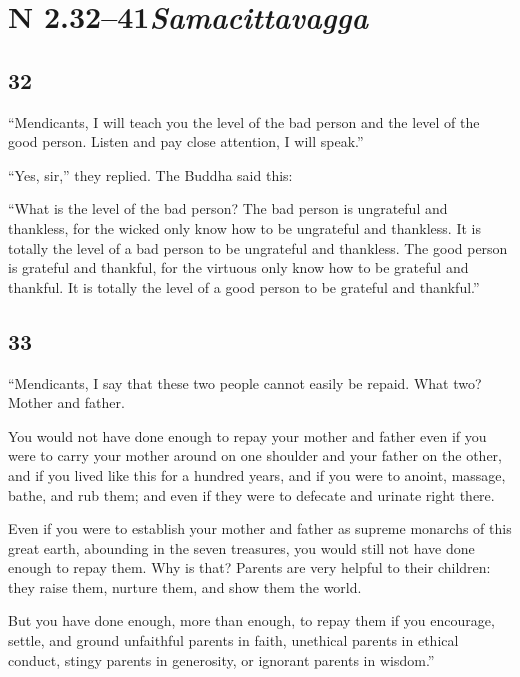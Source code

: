 \documentclass[12pt,openany]{book}%
\newcommand*{\suttatitleacronym}[1]{\smaller[2]{#1}\vspace*{.3em}}
\newcommand*{\suttatitleroot}[1]{\linebreak\smaller[2]\itshape{#1}}
\newcommand*{\tocacronym}[1]{\hspace*{-3.3em}{#1}\quad}
\newcommand*{\tocroot}[1]{(\textit{#1})}
\begin{document}
%
\section*{{\suttatitleacronym AN 2.32–41}{\suttatitleroot Samacittavagga}}
\addcontentsline{toc}{section}{\tocacronym{AN 2.32–41} \tocroot{Samacittavagga}}

\subsection*{32 }

“Mendicants, I will teach you the level of the bad person and the level of the good person. Listen and pay close attention, I will speak.” 

“Yes, sir,” they replied. The Buddha said this: 

“What is the level of the bad person? The bad person is ungrateful and thankless, for the wicked only know how to be ungrateful and thankless. It is totally the level of a bad person to be ungrateful and thankless. The good person is grateful and thankful, for the virtuous only know how to be grateful and thankful. It is totally the level of a good person to be grateful and thankful.” 

\subsection*{33 }

“Mendicants, I say that these two people cannot easily be repaid. What two? Mother and father. 

You would not have done enough to repay your mother and father even if you were to carry your mother around on one shoulder and your father on the other, and if you lived like this for a hundred years, and if you were to anoint, massage, bathe, and rub them; and even if they were to defecate and urinate right there. 

Even if you were to establish your mother and father as supreme monarchs of this great earth, abounding in the seven treasures, you would still not have done enough to repay them. Why is that? Parents are very helpful to their children: they raise them, nurture them, and show them the world. 

But you have done enough, more than enough, to repay them if you encourage, settle, and ground unfaithful parents in faith, unethical parents in ethical conduct, stingy parents in generosity, or ignorant parents in wisdom.” 
\end{document}
